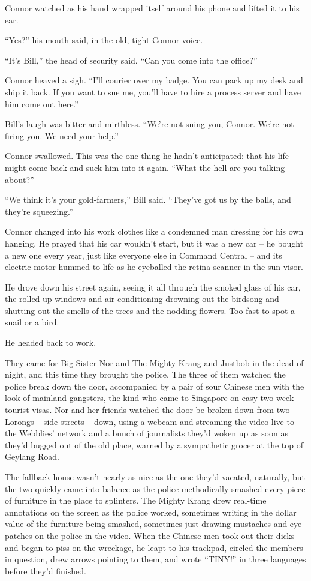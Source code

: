 Connor watched as his hand wrapped itself around his phone and
lifted it to his ear.

``Yes?'' his mouth said, in the old, tight Connor voice.

``It's Bill,'' the head of security said. ``Can you come into the
office?''

Connor heaved a sigh. ``I'll courier over my badge. You can pack up
my desk and ship it back. If you want to sue me, you'll have to
hire a process server and have him come out here.''

Bill's laugh was bitter and mirthless. ``We're not suing you,
Connor. We're not firing you. We need your help.''

Connor swallowed. This was the one thing he hadn't anticipated:
that his life might come back and suck him into it again. ``What the
hell are you talking about?''

``We think it's your gold-farmers,'' Bill said. ``They've got us by
the balls, and they're squeezing.''

Connor changed into his work clothes like a condemned man dressing
for his own hanging. He prayed that his car wouldn't start, but it
was a new car -- he bought a new one every year, just like everyone
else in Command Central -- and its electric motor hummed to life as
he eyeballed the retina-scanner in the sun-visor.

He drove down his street again, seeing it all through the smoked
glass of his car, the rolled up windows and air-conditioning
drowning out the birdsong and shutting out the smells of the trees
and the nodding flowers. Too fast to spot a snail or a bird.

He headed back to work.

\tb

They came for Big Sister Nor and The Mighty Krang and Justbob in
the dead of night, and this time they brought the police. The three
of them watched the police break down the door, accompanied by a
pair of sour Chinese men with the look of mainland gangsters, the
kind who came to Singapore on easy two-week tourist visas. Nor and
her friends watched the door be broken down from two Lorongs --
side-streets -- down, using a webcam and streaming the video live
to the Webblies' network and a bunch of journalists they'd woken up
as soon as they'd bugged out of the old place, warned by a
sympathetic grocer at the top of Geylang Road.

The fallback house wasn't nearly as nice as the one they'd vacated,
naturally, but the two quickly came into balance as the police
methodically smashed every piece of furniture in the place to
splinters. The Mighty Krang drew real-time annotations on the
screen as the police worked, sometimes writing in the dollar value
of the furniture being smashed, sometimes just drawing mustaches
and eye-patches on the police in the video. When the Chinese men
took out their dicks and began to piss on the wreckage, he leapt to
his trackpad, circled the members in question, drew arrows pointing
to them, and wrote ``TINY!'' in three languages before they'd
finished.


